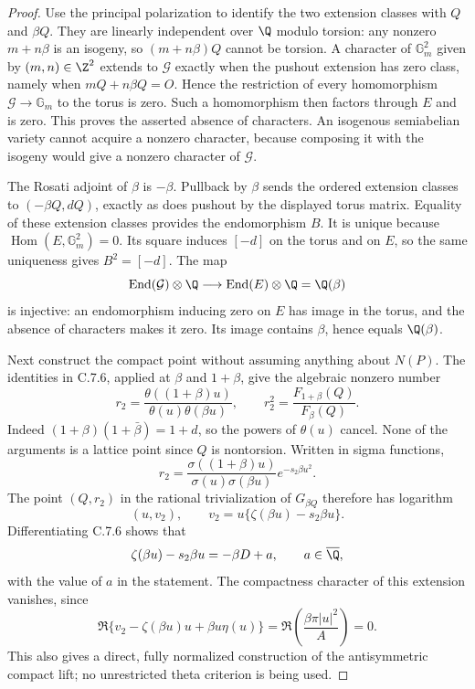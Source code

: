 \begin{proof}
Use the principal polarization to identify the two extension
classes with $Q$ and $\beta Q$. They are linearly independent
over $\Q$ modulo torsion: any nonzero $m+n\beta$ is an
isogeny, so $(m+n\beta)Q$ cannot be torsion. A character
of $\mathbb G_m^2$ given by $(m,n)\in\Z^2$ extends to
$\mathcal G$ exactly when the pushout extension has zero
class, namely when $mQ+n\beta Q=O$. Hence the restriction
of every homomorphism $\mathcal G\to\mathbb G_m$ to
the torus is zero. Such a homomorphism then factors through
$E$ and is zero. This proves the asserted absence of
characters. An isogenous semiabelian variety cannot acquire
a nonzero character, because composing it with the isogeny
would give a nonzero character of $\mathcal G$.

The Rosati adjoint of $\beta$ is $-\beta$. Pullback by
$\beta$ sends the ordered extension classes to
$(-\beta Q,dQ)$, exactly as does pushout by the displayed
torus matrix. Equality of these extension classes provides
the endomorphism $B$. It is unique because
$\operatorname{Hom}(E,\mathbb G_m^2)=0$. Its square
induces $[-d]$ on the torus and on $E$, so the same
uniqueness gives $B^2=[-d]$. The map
\[
 \operatorname{End}(\mathcal G)\otimes\Q
     \longrightarrow\operatorname{End}(E)\otimes\Q
          =\Q(\beta)
\]
is injective: an endomorphism inducing zero on $E$ has image
in the torus, and the absence of characters makes it zero.
Its image contains $\beta$, hence equals $\Q(\beta)$.

Next construct the compact point without assuming anything
about $N(P)$. The identities in C.7.6, applied at $\beta$
and $1+\beta$, give the algebraic nonzero number
\begin{equation}\label{eq:ce-ribet-r}
 r_2=\frac{\theta((1+\beta)u)}{\theta(u)\theta(\beta u)},
 \qquad r_2^2=\frac{F_{1+\beta}(Q)}{F_\beta(Q)}.
\end{equation}
Indeed $(1+\beta)(1+\bar\beta)=1+d$, so the powers
of $\theta(u)$ cancel. None of the arguments is a lattice
point since $Q$ is nontorsion. Written in sigma functions,
\[
 r_2=\frac{\sigma((1+\beta)u)}{\sigma(u)\sigma(\beta u)}
                         e^{-s_2\beta u^2}.
\]
The point $(Q,r_2)$ in the rational trivialization of
$G_{\beta Q}$ therefore has logarithm
\[
 (u,v_2),\qquad
 v_2=u\{\zeta(\beta u)-s_2\beta u\}.
\]
Differentiating C.7.6 shows that
\begin{equation}\label{eq:ce-zeta}
 \zeta(\beta u)-s_2\beta u=-\beta D+a,
 \qquad a\in\overline\Q,
\end{equation}
with the value of $a$ in the statement. The compactness
character of this extension vanishes, since
\[
 \Re\{v_2-\zeta(\beta u)u+\beta u\eta(u)\}
    =\Re\left(\frac{\beta\pi|u|^2}{A}\right)=0.
\]
This also gives a direct, fully normalized construction of
the antisymmetric compact lift; no unrestricted theta
criterion is being used.


\end{proof}
